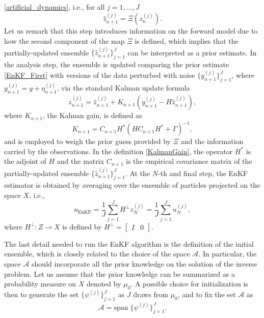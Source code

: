 \documentclass[10pt]{article}
\begin{document}
\eqref{artificial_dynamics}, i.e., for all $j = 1, \ldots, J$
\begin{equation}\label{EnKF_First}
	\hat{z}_{n+1}^{(j)} = \Xi(z_n^{(j)}).
\end{equation}
Let us remark that this step introduces information on the forward model due to how the second component of the map $\Xi$ is defined, which implies that the partially-updated ensemble $\{\hat z_{n+1}^{(j)} \}_{j=1}^J$ can be interpreted as a prior estimate. In the analysis step, the ensemble is updated comparing the prior estimate \eqref{EnKF_First} with versions of the data perturbed with noise $\{ y_{n+1}^{(j)} \}_{j=1}^J$, where $y_{n+1}^{(j)} = y + \eta_{n+1}^{(j)}$, via the standard Kalman update formula
\begin{equation}\label{KalmanUpdate}
	z_{n+1}^{(j)} = \hat{z}_{n+1}^{(j)} + K_{n+1} (y_{n+1}^{(j)} - H \hat{z}_{n+1}^{(j)}),
\end{equation}
where $K_{n+1}$, the Kalman gain, is defined as
\begin{equation}\label{KalmanGain}
	K_{n+1} = C_{n+1} H^* (H C_{n+1} H^* + \Gamma)^{-1},
\end{equation}
and is employed to weigh the prior guess provided by $\Xi$ and the information carried by the observations. In the definition \eqref{KalmanGain}, the operator $H^*$ is the adjoint of $H$ and the matrix $C_{n+1}$ is the empirical covariance matrix of the partially-updated ensemble $\{\hat z_{n+1}^{(j)} \}_{j=1}^J$. At the $N$-th and final step, the EnKF estimator is obtained by averaging over the ensemble of particles projected on the space $X$, i.e.,
\begin{equation*}
	u_{\mathrm{EnKF}} = \frac{1}{J} \sum_{j = 1}^J H^{\perp} z_{N}^{(j)} = \frac{1}{J} \sum_{j = 1}^J u_{N}^{(j)},
\end{equation*}
where $H^{\perp} \colon Z \to X$ is defined by $H^{\perp} = \begin{bmatrix} I & 0 \end{bmatrix}$.

The last detail needed to run the EnKF algorithm is the definition of the initial ensemble, which is closely related to the choice of the space $\mathcal{A}$. In particular, the space $\mathcal A$ should incorporate all the prior knowledge on the solution of the inverse problem. Let us assume that the prior knowledge can be summarized as a probability measure on $X$ denoted by $\mu_0$. A possible choice for initialization is then to generate the set $\{ \psi^{(j)} \}_{j = 1}^J$ as $J$ draws from $\mu_0$, and to fix the set $\mathcal{A}$ as
\[ \mathcal{A} = \mathrm{span} \; \{\psi^{(j)} \}_{j=1}^J. \]
\end{document}
